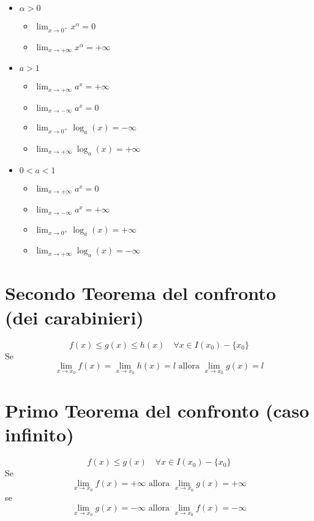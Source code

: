\documentclass[12pt, a4paper]{report}
\begin{document}
    \begin{itemize}
        \item $\alpha>0$ \begin{itemize}
            \item $\lim_{x\to 0^{+}}x^{\alpha}=0$
            \item $\lim_{x\to +\infty}x^{\alpha}=+\infty$
        \end{itemize}
        \item $a > 1$ \begin{itemize}
            \item $\lim_{x\to +\infty}a^{x}=+\infty$
            \item $\lim_{x\to -\infty}a^{x}=0$
            \item $\lim_{x\to 0^{+}}\log_{a}(x)=-\infty$
            \item $\lim_{x\to +\infty}\log_{a}(x)=+\infty$
        \end{itemize}
        \item $0<a<1$ \begin{itemize}
            \item $\lim_{x\to +\infty}a^{x}=0$
            \item $\lim_{x\to -\infty}a^{x}=+\infty$
            \item $\lim_{x\to 0^{+}}\log_{a}(x)=+\infty$
            \item $\lim_{x\to +\infty}\log_{a}(x)=-\infty$
        \end{itemize}
    \end{itemize}
    \section{Secondo Teorema del confronto (dei carabinieri)}
    \begin{equation*}
        f(x)\leq g(x)\leq h(x) \quad \forall x \in I(x_{0})-\{x_{0}\}
    \end{equation*}
    Se
    \begin{equation*}
        \lim_{x\to x_{0}}f(x)=\lim_{x\to x_{0}}h(x)=l \text{ allora }\lim_{x\to x_{0}}g(x)=l
    \end{equation*}
    \section{Primo Teorema del confronto (caso infinito)}
    \begin{equation*}
        f(x)\leq g(x) \quad \forall x \in I(x_{0})-\{x_{0}\}
    \end{equation*}
    Se 
    \begin{equation*}
        \lim_{x\to x_{0}}f(x)=+\infty \text{ allora }\lim_{x\to x_{0}}g(x)=+\infty
    \end{equation*}
    se
    \begin{equation*}
        \lim_{x\to x_{0}}g(x)=-\infty \text{ allora }\lim_{x\to x_{0}}f(x)=-\infty
    \end{equation*}
\end{document}
